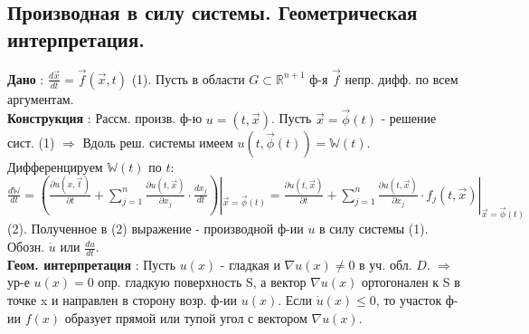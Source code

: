 \documentclass[unicode, 10pt, a4paper,oneside, landscape]{article}
\begin{document}
\begin{multicols}{4}
\subsection{Производная в силу системы. Геометрическая интерпретация.}

{\bf Дано} : $\frac{d\vec{x}}{dt} = \vec{f}(\vec{x}, t)$ (1). Пусть в области $G \subset \mathbb{R}^{n+1}$ ф-я $\vec{f}$ непр. дифф. по всем аргументам.\\
{\bf Конструкция} : Рассм. произв. ф-ю $u = (t, \vec{x})$. Пусть $\vec{x} = \vec{\phi}(t)$ - решение сист. (1) $\Rightarrow$ Вдоль реш. системы имеем $u(t, \vec{\phi}(t)) = \mathbb{W}(t)$. Дифференцируем $\mathbb{W}(t)$ по $t$: $\frac{d\mathbb{W}}{dt} = (\frac{\partial u(x, \vec{t})}{\partial t} + \sum_{j=1}^n\frac{\partial u(t, \vec{x})}{\partial x_j} \cdot \frac{dx_j}{dt})|_{\vec{x} = \vec{\phi}(t)} = \frac{\partial u(t, \vec{x})}{\partial t} + \sum_{j=1}^n \frac{\partial u(t, \vec{x})}{\partial x_j} \cdot f_j(t, \vec{x})|_{\vec{x} = \vec{\phi}(t)}$ (2). Полученное в (2) выражение - производной ф-ии $u$ в силу системы (1). Обозн. $\dot{u}$ или $\frac{du}{dt}$.\\
{\bf Геом. интерпретация} : Пусть $u(x)$ - гладкая и $\nabla u(x) \neq 0$ в уч. обл. $D$. $\Rightarrow$ ур-е $u(x) = 0$ опр. гладкую поверхность S, а вектор $\nabla u(x)$ ортогонален к S в точке x и направлен в сторону возр. ф-ии $u(x)$. Если $\dot{u}(x) \leq 0$, то участок ф-ии $f(x)$ образует прямой или тупой угол с вектором $\nabla u(x)$.



\end{multicols}
\end{document}
